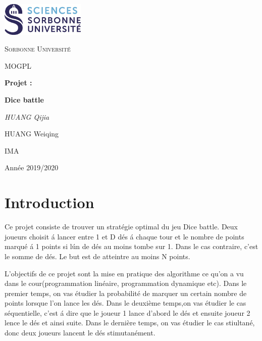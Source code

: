 \documentclass[12pt,a4paper]{article}
\begin{document}
\begin{titlepage}
	\centering
	\includegraphics[width=0.30\textwidth]{logo.png}\par\vspace{1cm}
	{\scshape\LARGE Sorbonne Universit\'e \par}
	\vspace{1cm}
	{\scshape\Large MOGPL\par}
	\vspace{1.5cm}
	{\Large \bfseries Projet :\par}
	{\huge\bfseries Dice battle\par}
	\vspace{2cm}
	{\Large\itshape HUANG Qijia \par HUANG Weiqing\par}
	
	\vfill

	{\large IMA\par}
	{\large Ann\'ee 2019/2020\par}
\end{titlepage}




\tableofcontents


\newpage

\part*{Introduction}

Ce projet consiste de trouver un strat\'egie optimal du jeu Dice battle. Deux joueurs choisit \'a lancer entre 1 et D d\'es \'a chaque tour et le nombre de points marqu\'e \'a 1 points si l\'un de d\'es au moins tombe sur 1. Dans le cas contraire, c'est le somme de dés. Le but est de atteintre au moins N points.

L'objectifs de ce projet sont la mise en pratique des algorithme ce qu'on a vu dans le cour(programmation lin\'eaire, programmation dynamique etc). Dans le premier temps, on vas \'etudier la probabilité de marquer un certain nombre de points lorsque l'on lance les dés. Dans le deuxi\`eme temps,on vas étudier le cas s\'equentielle, c'est \'a dire que le joueur 1 lance d'abord le d\'es et ensuite joueur 2 lence le d\'es et ainsi suite. Dans le derni\`ere temps, on vas étudier le cas stiultan\'e, donc deux joueurs lancent le dés stimutan\'ement.  
\end{document}
